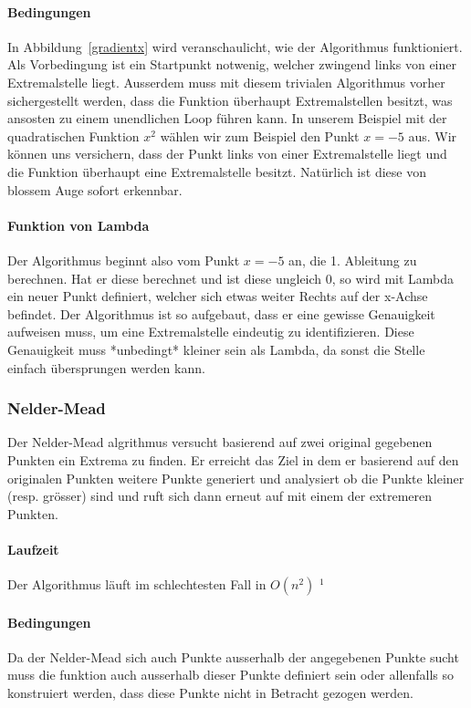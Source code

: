 \documentclass[10pt]{article}         %
\begin{document}
\paragraph{Bedingungen}
In Abbildung~\ref{gradientx} wird veranschaulicht, wie der Algorithmus funktioniert. Als Vorbedingung ist ein Startpunkt notwenig, welcher zwingend links von einer Extremalstelle liegt. Ausserdem muss mit diesem trivialen Algorithmus vorher sichergestellt werden, dass die Funktion überhaupt Extremalstellen besitzt, was ansosten zu einem unendlichen Loop führen kann. In unserem Beispiel mit der quadratischen Funktion $x^2$ wählen wir zum Beispiel den Punkt $x=-5$ aus. Wir können uns versichern, dass der Punkt links von einer Extremalstelle liegt und die Funktion überhaupt eine Extremalstelle besitzt. Natürlich ist diese von blossem Auge sofort erkennbar. 

\paragraph{Funktion von Lambda}
Der Algorithmus beginnt also vom Punkt $x=-5$ an, die 1. Ableitung zu berechnen. Hat er diese berechnet und ist diese ungleich 0, so wird mit Lambda ein neuer Punkt definiert, welcher sich etwas weiter Rechts auf der x-Achse befindet. Der Algorithmus ist so aufgebaut, dass er eine gewisse Genauigkeit aufweisen muss, um eine Extremalstelle eindeutig zu identifizieren. Diese Genauigkeit muss *unbedingt* kleiner sein als Lambda, da sonst die Stelle einfach übersprungen werden kann.

\subsubsection{Nelder-Mead}
Der Nelder-Mead algrithmus versucht basierend auf zwei original gegebenen Punkten ein Extrema zu finden. Er erreicht das Ziel in dem er basierend auf den originalen Punkten weitere Punkte generiert und analysiert ob die Punkte kleiner (resp. grösser) sind und ruft sich dann erneut auf mit einem der extremeren Punkten.

\paragraph{Laufzeit}
Der Algorithmus läuft im schlechtesten Fall in $O(n^2)$ $^1$

\paragraph{Bedingungen}
Da der Nelder-Mead sich auch Punkte ausserhalb der angegebenen Punkte sucht muss die funktion auch ausserhalb dieser Punkte definiert sein oder allenfalls so konstruiert werden, dass diese Punkte nicht in Betracht gezogen werden.
\end{document}
